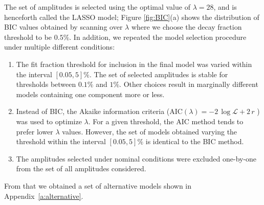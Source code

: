 The set of amplitudes is selected using the optimal value of $\lambda=28$, and is henceforth called the LASSO model; 
Figure \ref{fig:BIC}(a) shows the distribution of BIC values obtained by scanning over $\lambda$
where we choose the decay fraction threshold to be $0.5 \%$.
In addition, we repeated the model selection procedure under multiple different conditions:
\begin{enumerate}
	\item The fit fraction threshold for inclusion in the final model was varied within the interval $[0.05, 5] \%$.
		The set of selected amplitudes is stable for thresholds between $0.1\%$ and $1\%$. 
		Other choices result in marginally different models containing one component more or less.
	\item Instead of BIC, the Akaike information criteria ($\text{AIC}(\lambda) = -2 \, \log  \mathcal L + 2 \, r$ \cite{AIC}) was used to optimize $\lambda$.
		For a given threshold, the AIC method tends to prefer %
		lower $\lambda$ values.
		However, the set of models obtained varying the threshold within the interval $[0.05, 5] \%$
		is identical to the BIC method. 
	\item The amplitudes selected under nominal conditions were excluded one-by-one from the set of all amplitudes considered.  
\end{enumerate}
From that we obtained a set of alternative models shown in Appendix~\ref{a:alternative}.

